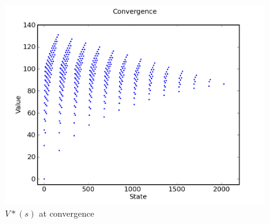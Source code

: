 \documentclass[a4paper]{article}
\begin{document}
\begin{figure}[h]
\center
\includegraphics[scale=0.75]{../graphs/value_iteration/convergence.png}
\caption{$V*(s)$ at convergence}
\end{figure}
\end{document}
